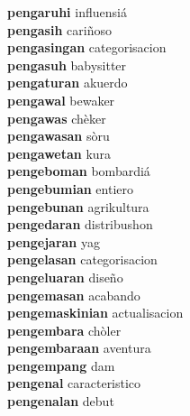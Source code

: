 \textbf{pengaruhi } influensiá \\
\textbf{pengasih } cariñoso \\
\textbf{pengasingan } categorisacion \\
\textbf{pengasuh } babysitter \\
\textbf{pengaturan } akuerdo \\
\textbf{pengawal } bewaker \\
\textbf{pengawas } chèker \\
\textbf{pengawasan } sòru \\
\textbf{pengawetan } kura \\
\textbf{pengeboman } bombardiá \\
\textbf{pengebumian } entiero \\
\textbf{pengebunan } agrikultura \\
\textbf{pengedaran } distribushon \\
\textbf{pengejaran } yag \\
\textbf{pengelasan } categorisacion \\
\textbf{pengeluaran } diseño \\
\textbf{pengemasan } acabando \\
\textbf{pengemaskinian } actualisacion \\
\textbf{pengembara } chòler \\
\textbf{pengembaraan } aventura \\
\textbf{pengempang } dam \\
\textbf{pengenal } caracteristico \\
\textbf{pengenalan } debut \\
